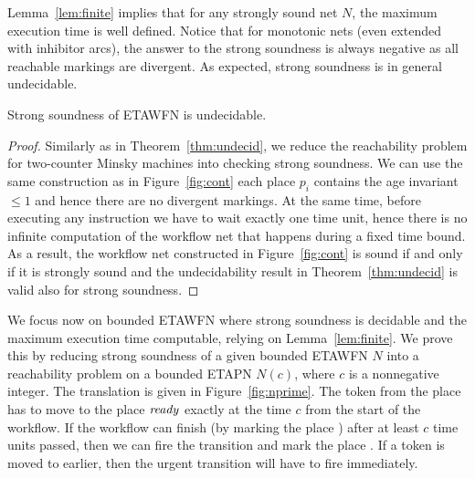 Lemma~\ref{lem:finite} implies that 
for any strongly sound net $N$, the maximum execution
time is well defined.
Notice that for monotonic nets (even extended
with inhibitor arcs), the answer to the strong soundness is always
negative as all reachable markings are divergent. As expected,
strong soundness is in general undecidable.

\begin{theorem} \label{thm:strong-undecid}
Strong soundness of ETAWFN %
is undecidable.
\end{theorem}

\begin{proof}
Similarly as in Theorem~\ref{thm:undecid},
we reduce the reachability problem for
two-counter Minsky machines into checking strong soundness. We can use
the same construction as in Figure~\ref{fig:cont} each place
$p_i$ contains the age invariant $\leq 1$ and hence there are no divergent
markings. At the same time, before executing any instruction we have to
wait exactly one time unit, hence there is no infinite computation of the
workflow net that happens during a fixed time bound. As a result,
the workflow net constructed in Figure~\ref{fig:cont} is sound if and only
if it is strongly sound and the undecidability result in 
Theorem~\ref{thm:undecid} is valid also for strong soundness.
\end{proof}

We focus now on bounded ETAWFN where
strong soundness is decidable and the maximum execution 
time computable, relying on Lemma~\ref{lem:finite}. 
We prove this by reducing strong soundness of a given bounded ETAWFN $N$
into a reachability problem on a bounded ETAPN $N(c)$, 
where $c$ is a nonnegative integer. The translation
is given in Figure~\ref{fig:nprime}. 
The token from the place  has to move to the place ${\mathit{ready}}$
exactly at the time $c$ from the start of the workflow.
If the workflow can finish (by marking the place )
after at least $c$ time units passed, then we can fire the transition
 and mark the place . If %
a token is moved to  earlier, then the urgent transition
 will have to fire immediately.

